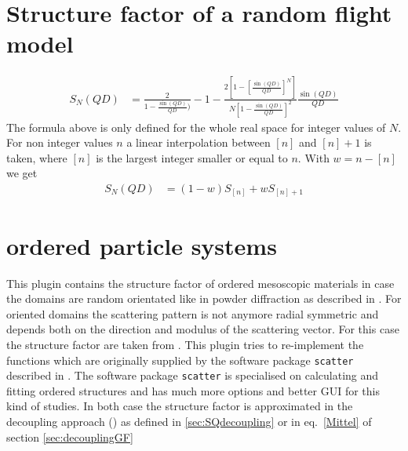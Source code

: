 \section{Structure factor of a random flight model} \hspace{1pt}
\cite{Schweins2004,Burchard1970,Giehm2010}
\begin{align}
S_N(QD)&=
     \frac{2}{1-\frac{\sin⁡(QD)}{QD} )}-1-\frac{2\left[1-\left[\frac{\sin⁡(QD)}{QD}\right]^N \right]}{N\left[1-\frac{\sin⁡(QD)}{QD}\right]^2}   \frac{\sin⁡(QD)}{QD}
\end{align}
The formula above is only defined for the whole real space for integer values of $N$. For non integer values $n$ a linear interpolation between $[n]$ and $[n]+1$ is taken, where $[n]$ is the largest integer smaller or equal to $n$. With $w=n-[n]$ we get
\begin{align}
S_N(QD)&= (1-w)S_{[n]} + wS_{[n]+1}
\end{align}

\section{ordered particle systems} \hspace{1pt}
\label{sec:ops}
This plugin contains the structure factor of ordered mesoscopic materials in case the domains are random orientated like in powder diffraction as described in \cite{Forster2005}. For oriented domains the scattering pattern is not anymore radial symmetric and depends both on the direction and modulus of the scattering vector. For this case the structure factor are taken from  \cite{Forster2011}. This plugin tries to re-implement the functions which are originally supplied by the software package \texttt{scatter} described in \cite{Forster2010}. The software package \texttt{scatter} is specialised on calculating and fitting ordered structures and has much more options and better GUI for this kind of studies. In both case the structure factor is approximated in the decoupling approach (\cite{Kotlarchyk1983}) as defined in \ref{sec:SQdecoupling} or in eq.\ \ref{Mittel} of section \ref{sec:decouplingGF}

